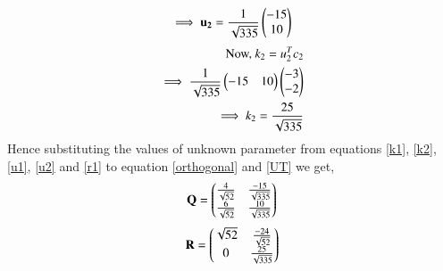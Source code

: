 \documentclass[journal,12pt,twocolumn]{IEEEtran}
\begin{document}
\begin{align}
\implies\mathbf{u_2} = \frac{1}{\sqrt{335}}\begin{pmatrix}-15\\10\end{pmatrix}\label{u2}
\end{align}
\begin{align}
\mbox{Now, } k_2 = u_2^Tc_2\\
\implies \frac{1}{\sqrt{335}}\begin{pmatrix}-15&10\end{pmatrix}\begin{pmatrix}-3\\-2\end{pmatrix}\\\implies k_2 = \frac{25}{\sqrt{335}} \label{k2}
\end{align}
Hence substituting the values of unknown parameter from equations \eqref{k1}, \eqref{k2}, \eqref{u1}, \eqref{u2} and \eqref{r1} to equation \eqref{orthogonal} and \eqref{UT} we get,
\begin{align}
\mathbf{Q} = \begin{pmatrix}\frac{4}{\sqrt{52}}&\frac{-15}{\sqrt{335}}\\\frac{6}{\sqrt{52}}&\frac{10}{\sqrt{335}}\end{pmatrix}
\end{align} 
\begin{align}
\mathbf{R} = \begin{pmatrix}\sqrt{52}&\frac{-24}{\sqrt{52}}\\0&\frac{25}{\sqrt{335}}\end{pmatrix}
\end{align}
\end{document}
